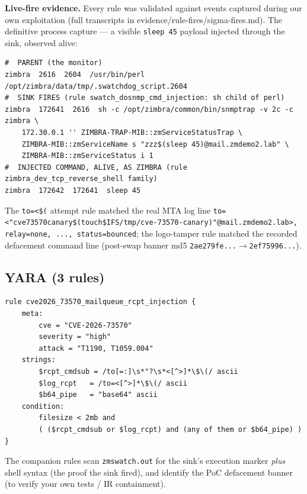 \documentclass[journal]{IEEEtran}
\begin{document}
\textbf{Live-fire evidence.} Every rule was validated against events captured
during our own exploitation (full transcripts in
evidence/rule-fires/sigma-fires.md). The definitive process capture — a
visible \texttt{sleep 45} payload injected through the sink, observed alive:
\begin{lstlisting}[style=shell,caption={Live process tree during injection (2026-08-24 08:42 UTC)}]
#  PARENT (the monitor)
zimbra  2616  2604  /usr/bin/perl /opt/zimbra/data/tmp/.swatchdog_script.2604
#  SINK FIRES (rule swatch_dosnmp_cmd_injection: sh child of perl)
zimbra  172641  2616  sh -c /opt/zimbra/common/bin/snmptrap -v 2c -c zimbra \
    172.30.0.1 '' ZIMBRA-TRAP-MIB::zmServiceStatusTrap \
    ZIMBRA-MIB::zmServiceName s "zzz$(sleep 45)@mail.zmdemo2.lab" \
    ZIMBRA-MIB::zmServiceStatus i 1
#  INJECTED COMMAND, ALIVE, AS ZIMBRA (rule zimbra_dev_tcp_reverse_shell family)
zimbra  172642  172641  sleep 45
\end{lstlisting}
The \texttt{to=<\$(} attempt rule matched the real MTA log line
\texttt{to=<"cve73570canary\$(touch\${IFS}/\hspace{0pt}tmp/cve-73570-canary)"@\hspace{0pt}mail.zmdemo2.lab>,
relay=none, ..., status=bounced}; the logo-tamper rule matched the recorded
defacement command line (post-swap banner md5
\texttt{2ae279fe...}$\rightarrow$\texttt{2ef75996...}).

\subsection{YARA (3 rules)}

\begin{lstlisting}[style=yar,caption={YARA: envelope recipient with command substitution (mail-queue scan)}]
rule cve2026_73570_mailqueue_rcpt_injection {
    meta:
        cve = "CVE-2026-73570"
        severity = "high"
        attack = "T1190, T1059.004"
    strings:
        $rcpt_cmdsub = /to[=:]\s*"?\s*<[^>]*\$\(/ ascii
        $log_rcpt   = /to=<[^>]*\$\(/ ascii
        $b64_pipe   = "base64" ascii
    condition:
        filesize < 2mb and
        ( ($rcpt_cmdsub or $log_rcpt) and (any of them or $b64_pipe) )
}
\end{lstlisting}

The companion rules scan \texttt{zmswatch.out} for the sink's execution
marker \emph{plus} shell syntax (the proof the sink fired), and identify the
PoC defacement banner (to verify your own tests / IR containment).
\end{document}
